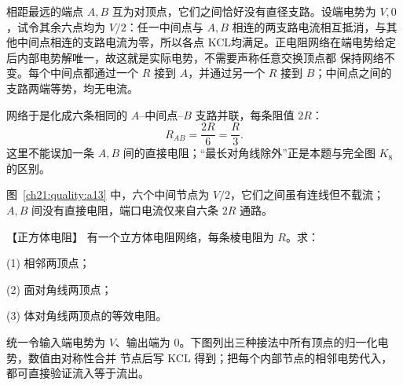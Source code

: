 {\begin{xesolution}
相距最远的端点 $A,B$ 互为对顶点，它们之间恰好没有直径支路。设端电势为 $V,0$，试令其余六点均为
$V/2$：任一中间点与 $A,B$ 相连的两支路电流相互抵消，与其他中间点相连的支路电流为零，所以各点
KCL均满足。正电阻网络在端电势给定后内部电势解唯一，故这就是实际电势，不需要声称任意交换顶点都
保持网络不变。每个中间点都通过一个 $R$ 接到 $A$，并通过另一个 $R$ 接到
$B$；中间点之间的支路两端等势，均无电流。

网络于是化成六条相同的 $A$--中间点--$B$ 支路并联，每条阻值 $2R$：
\[
  \boxed{R_{AB}=\frac{2R}{6}=\frac R3}.
\]
这里不能误加一条 $A,B$ 间的直接电阻；“最长对角线除外”正是本题与完全图 $K_8$ 的区别。

\par\noindent\begin{minipage}{\linewidth}
\octagonReductionFigure
{}
\end{minipage}\par\medskip

图~\ref{ch21:quality:a13} 中，六个中间节点为 $V/2$，它们之间虽有连线但不载流；$A,B$ 间没有直接电阻，端口电流仅来自六条 $2R$ 通路。
\end{xesolution}



\begin{origexamplebox}{【正方体电阻】}\label{ch21:ex:s37-6-6}
有一个立方体电阻网络，每条棱电阻为 $R$。求：

(1) 相邻两顶点；

(2) 面对角线两顶点；

(3) 体对角线两顶点的等效电阻。
\par\noindent\begin{minipage}{\linewidth}
\cubeProblemFigure
{}
\end{minipage}\par\medskip
\end{origexamplebox}\par\nopagebreak[4]


\begin{xesolution}
统一令输入端电势为 $V$、输出端为 $0$。下图列出三种接法中所有顶点的归一化电势，数值由对称性合并
节点后写 KCL 得到；把每个内部节点的相邻电势代入，都可直接验证流入等于流出。

\par\noindent\begin{minipage}{\linewidth}
\cubePotentialFigure
{}
\end{minipage}\par\medskip


\end{xesolution}}
